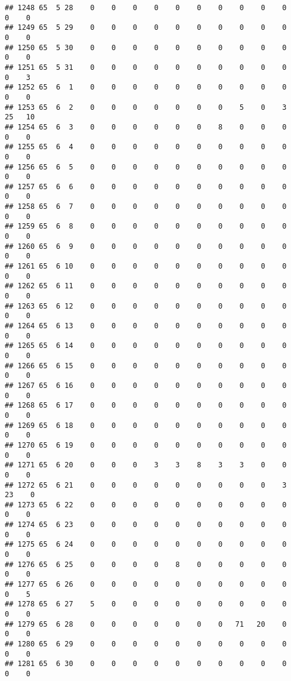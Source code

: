 \documentclass[]{article}
\begin{document}
\begin{verbatim}
## 1248 65  5 28    0    0    0    0    0    0    0    0    0    0    0    0
## 1249 65  5 29    0    0    0    0    0    0    0    0    0    0    0    0
## 1250 65  5 30    0    0    0    0    0    0    0    0    0    0    0    0
## 1251 65  5 31    0    0    0    0    0    0    0    0    0    0    0    3
## 1252 65  6  1    0    0    0    0    0    0    0    0    0    0    0    0
## 1253 65  6  2    0    0    0    0    0    0    0    5    0    3   25   10
## 1254 65  6  3    0    0    0    0    0    0    8    0    0    0    0    0
## 1255 65  6  4    0    0    0    0    0    0    0    0    0    0    0    0
## 1256 65  6  5    0    0    0    0    0    0    0    0    0    0    0    0
## 1257 65  6  6    0    0    0    0    0    0    0    0    0    0    0    0
## 1258 65  6  7    0    0    0    0    0    0    0    0    0    0    0    0
## 1259 65  6  8    0    0    0    0    0    0    0    0    0    0    0    0
## 1260 65  6  9    0    0    0    0    0    0    0    0    0    0    0    0
## 1261 65  6 10    0    0    0    0    0    0    0    0    0    0    0    0
## 1262 65  6 11    0    0    0    0    0    0    0    0    0    0    0    0
## 1263 65  6 12    0    0    0    0    0    0    0    0    0    0    0    0
## 1264 65  6 13    0    0    0    0    0    0    0    0    0    0    0    0
## 1265 65  6 14    0    0    0    0    0    0    0    0    0    0    0    0
## 1266 65  6 15    0    0    0    0    0    0    0    0    0    0    0    0
## 1267 65  6 16    0    0    0    0    0    0    0    0    0    0    0    0
## 1268 65  6 17    0    0    0    0    0    0    0    0    0    0    0    0
## 1269 65  6 18    0    0    0    0    0    0    0    0    0    0    0    0
## 1270 65  6 19    0    0    0    0    0    0    0    0    0    0    0    0
## 1271 65  6 20    0    0    0    3    3    8    3    3    0    0    0    0
## 1272 65  6 21    0    0    0    0    0    0    0    0    0    3   23    0
## 1273 65  6 22    0    0    0    0    0    0    0    0    0    0    0    0
## 1274 65  6 23    0    0    0    0    0    0    0    0    0    0    0    0
## 1275 65  6 24    0    0    0    0    0    0    0    0    0    0    0    0
## 1276 65  6 25    0    0    0    0    8    0    0    0    0    0    0    0
## 1277 65  6 26    0    0    0    0    0    0    0    0    0    0    0    5
## 1278 65  6 27    5    0    0    0    0    0    0    0    0    0    0    0
## 1279 65  6 28    0    0    0    0    0    0    0   71   20    0    0    0
## 1280 65  6 29    0    0    0    0    0    0    0    0    0    0    0    0
## 1281 65  6 30    0    0    0    0    0    0    0    0    0    0    0    0

\end{verbatim}
\end{document}
